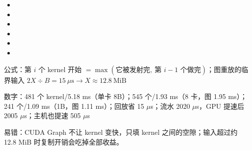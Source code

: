 \documentclass[UTF8,10.5pt,openany]{ctexbook}
\newcommand{\meta}[2]{\vspace{1pt}\begingroup\sloppy\raggedright{\sffamily\footnotesize\color{grayt}#1：#2}\par\endgroup}
\begin{document}
\begin{itemize}[leftmargin=1.35em,itemsep=2.2pt,topsep=1pt,parsep=0pt]
\item \begingroup{}\endgroup
\item \begingroup{}\endgroup
\item \begingroup{}\endgroup
\item \begingroup{}\endgroup
\item \begingroup{}\endgroup
\item \begingroup{}\endgroup
\end{itemize}
\meta{公式}{第 $i$ 个 kernel 开始 $=\max(\text{它被发射完},\ \text{第 }i-1\text{ 个做完})$；图重放的临界输入 $2X\div B=15\ \mu\text{s}\to X\approx12.8\ \text{MiB}$}
\meta{数字}{481 个 kernel/5.18 ms（单卡 8B）；545 个/1.93 ms（8 卡，图 1.95 ms）；241 个/1.09 ms（1B，图 1.11 ms）；回放省 15 $\mu$s；流水 2020 $\mu$s，GPU 提速后 2005 $\mu$s；主机也提速 505 $\mu$s}
\meta{易错}{CUDA Graph 不让 kernel 变快，只填 kernel 之间的空隙；输入超过约 12.8 MiB 时复制开销会吃掉全部收益。}
\end{document}

